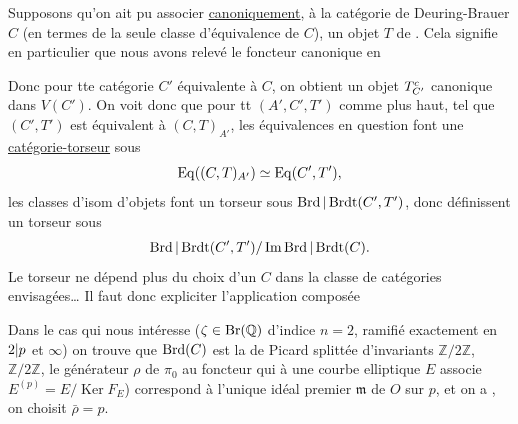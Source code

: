 
Supposons qu'on ait pu associer \uline{canoniquement}, à la catégorie de Deuring-Brauer $C$ (en termes de la seule classe d'équivalence de $C$), un objet $T$ de . Cela signifie en particulier que nous avons relevé le foncteur canonique 
en

Donc pour tte catégorie $C'$ équivalente à $C$, on obtient un objet $T_{C'}^{c}$ canonique dans $V(C')$.
On voit donc que pour tt $(A',C',T')$ comme plus haut,  tel que $(C',T')$ est équivalent à $(C,T)_{A'}$, les équivalences en question font une \uline{catégorie-torseur} sous
\[
\mathrm{Eq}((C,T)_{A'})
\simeq\mathrm{Eq}(C',T'),
\]
les classes d'isom d'objets font un torseur sous
$\operatorname{Brd}|\operatorname{Brdt}(C',T')$,
donc définissent un torseur sous
\[
\operatorname{Brd}|\operatorname{Brdt}(C',T')/
\operatorname{Im}\operatorname{Brd}|\operatorname{Brdt}(C).
\]
Le torseur ne dépend plus du choix d'un $C$ dans la classe de catégories envisagées\ldots
Il faut donc expliciter l'application composée


Dans le cas qui nous intéresse ($\zeta\in\mathrm{Br}(\mathbb Q)$ d'indice $n=2$, ramifié exactement en $2|p$ et $\infty$) 
on trouve que $\operatorname{Brd}(C)$ est la   de Picard splittée d'invariants $\mathbb Z/2\mathbb Z$, $\mathbb Z/2\mathbb Z$, le générateur $\rho$ de $\pi_0$  au  foncteur qui à une courbe elliptique $E$ associe $E^{(p)}=E/\operatorname{Ker}F_E$)
correspond à l'unique idéal premier $\mathfrak m$ de $O$ sur $p$, et on a
, on choisit $\bar\rho=p$.

